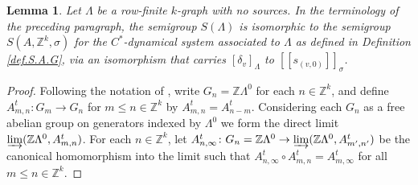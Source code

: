 \documentclass[a4paper, 12pt]{amsart}
\numberwithin{equation}{section}
\newcounter{theorem}
\newtheorem{lemma}[theorem]{Lemma}
\theoremstyle{remark}
\theoremstyle{definition}
\begin{document}
\begin{lemma}\label{lem.S.isom}
Let $\Lambda$ be a row-finite $k$-graph with no sources. In the terminology of the
preceding paragraph, the semigroup $S(\Lambda)$ is isomorphic to the semigroup
$S(A,{\mathbb{Z}}^k,\sigma)$ for the $C^*$-dynamical system associated to $\Lambda$ as defined in
Definition \ref{def.S.A.G}, via an isomorphism that carries ${{[{\delta_v}]_\Lambda}}$ to $[[s_{(v,0)}]]_\sigma$.
\end{lemma}
\begin{proof}
Following the notation of \cite{MR3507995}, write $G_n = {\mathbb{Z}} \Lambda^0$ for each $n\in
{\mathbb{Z}}^k$, and define ${A^t_{m,n} \colon G_m \to G_n}$ for $m \le n \in {\mathbb{Z}}^k$ by
$A^t_{m,n}= A^t_{n-m}$. Considering each $G_n$ as a free abelian group on generators
indexed by $\Lambda^0$ we form the direct limit $\varinjlim({\mathbb{Z}} \Lambda^0, A^t_{m,n})$.
For each $n\in {\mathbb{Z}}^k$, let $A^t_{n,\infty} \colon G_n = {\mathbb{Z}} \Lambda^0 \to
\varinjlim({\mathbb{Z}}\Lambda^0, A^t_{m',n'})$ be the canonical homomorphism into the limit such
that $A^t_{n,\infty} \circ A^t_{m,n} = A^t_{m,\infty}$ for all $m \le n\in {\mathbb{Z}}^k$.


\end{proof}
\end{document}

